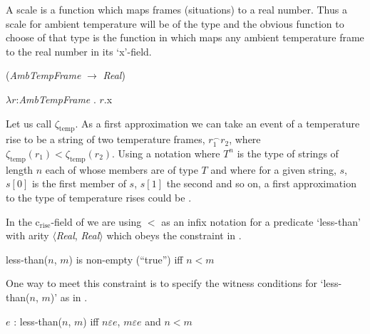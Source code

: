 A scale is a function which maps frames (situations) to a real
number.  Thus a scale for ambient temperature will be of the type
 and the obvious function to choose of that type is the
function in  which maps any ambient temperature frame to the
real number in its `x'-field.
\begin{ex} 
\begin{subex} 
 
\item (\textit{AmbTempFrame} $\rightarrow$ \textit{Real}) 
 
\item $\lambda r$:\textit{AmbTempFrame} . $r$.x 
 
\end{subex} 
\label{ex:scaleambtempframe}   
\end{ex} 
Let us call  $\zeta_{\mathrm{temp}}$.  As a first approximation we can take an event of
a temperature rise to be a string of two temperature frames,
$r_1^\frown r_2$, where $\zeta_{\mathrm{temp}}(r_1) <
\zeta_{\mathrm{temp}}(r_2)$.  Using a notation where $T^n$ is the type of
strings of length $n$ each of whose members are of type $T$ and where
for a given string, $s$, $s[0]$ is the first member of $s$, $s[1]$ the
second and so on, a first approximation to the type of temperature
rises could be \nexteg{}. 
\begin{ex} 
\end{ex} 
In the c$_{\mathrm{rise}}$-field of \preveg{} we are using $<$ as an
infix notation for a predicate `less-than' with arity
$\langle$\textit{Real}, \textit{Real}$\rangle$ which obeys the
constraint in \nexteg{}.
\begin{ex} 
less-than($n$, $m$) is non-empty (``true'') iff $n<m$ 
\end{ex}
One way to meet this constraint is to specify the witness conditions
for `less-than($n$, $m$)' as in \nexteg{}.
\begin{ex} 
$e$ : less-than($n$, $m$) iff $n\varepsilon e$, $m\varepsilon e$ and $n<m$ 
\end{ex} 
  

